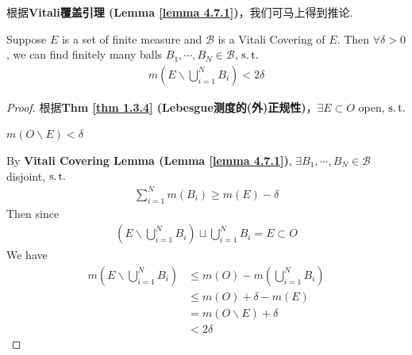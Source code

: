 	\newpage
	根据\textbf{Vitali覆盖引理 (Lemma \ref{lemma 4.7.1})}，我们可马上得到推论.
	\begin{corollary}\label{cor 4.7.2}
		Suppose $E$ is a set of finite measure and $\mathcal{B}$ is a Vitali Covering of $E$. Then $\forall \delta > 0$, we can find finitely many balls $B_1 , \cdots , B_N \in \mathcal{B}$, $\operatorname{s.t.}$
		\begin{align}
			m\left( E \backslash \bigcup_{i = 1}^{N}{B_i} \right) < 2\delta
		\end{align}
		
		\vspace{4em}
		\begin{proof}
			根据\textbf{Thm \ref{thm 1.3.4} (Lebesgue测度的(外)正规性)}，$\exists E \subset O$ open, $\operatorname{s.t.}$
			\begin{center}
				$m\left( O \backslash E \right) < \delta$
			\end{center}
			By \textbf{Vitali Covering Lemma (Lemma \ref{lemma 4.7.1})}, $\exists B_1 , \cdots , B_N \in \mathcal{B}$ disjoint, $\operatorname{s.t.}$
			\begin{align}
				\sum_{i = 1}^{N}{m(B_i)} \geq m(E) - \delta
			\end{align}
			Then since
			\begin{align}
				\left( E \backslash \bigcup_{i = 1}^{N}{B_i} \right) \sqcup \bigcup_{i = 1}^{N}{B_i} = E \subset O
			\end{align}
			We have
			\begin{align}
				m\left( E \backslash \bigcup_{i = 1}^{N}{B_i} \right)
				&\leq m(O) - m\left( \bigcup_{i = 1}^{N}{B_i} \right) \\
				&\leq m(O) + \delta - m(E) \\
				&= m(O \backslash E) + \delta \\
				&< 2\delta
			\end{align}
		\end{proof}
	\end{corollary}

\newpage

